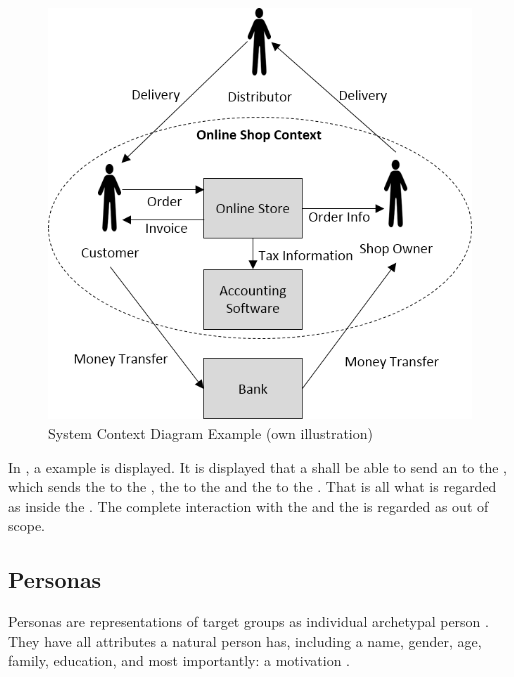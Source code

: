 \begin{figure}[H]
    \centering
    \includegraphics[height=.5\textheight]{img/SystemContextExample.png}
    \caption[System Context Diagram Example]{System Context Diagram Example (own illustration)}
    \label{fig:scEx}
\end{figure}

In , a example is displayed. It is displayed that a  shall be able to send an  to the , which sends the  to the , the  to the  and the  to the . That is all what is regarded as inside the . The complete interaction with the  and the  is regarded as out of scope.

\subsection{Personas \label{ssec:personas}}

Personas are representations of target groups as individual archetypal person \parencite[cf.][81]{Cooper.2007}. They have all attributes a natural person has, including a name, gender, age, family, education, and most importantly: a motivation \parencites[cf.][]{Platt.2016}[cf.][83-84]{Cooper.2007}. 

